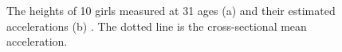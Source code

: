 \begin{figure}
    \centering
    \qquad
    \caption[Functional data]{The heights of 10 girls measured at 31 ages (a) and their estimated accelerations (b) \cite{ramsay_functional_2006}. The dotted line is the cross-sectional mean acceleration.}
    \label{fig:tuttoinsieme}
\end{figure}

